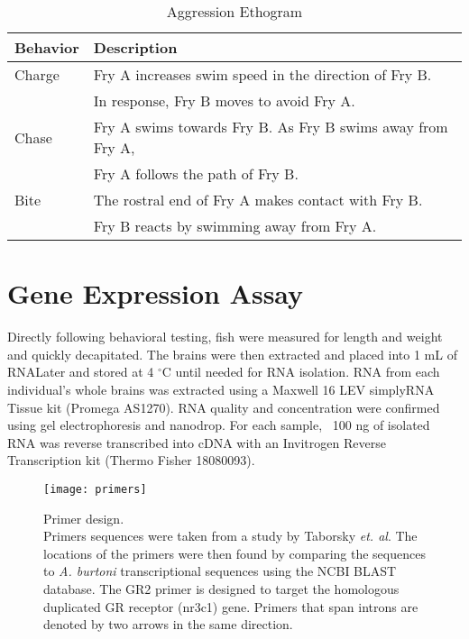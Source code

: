 \documentclass[12pt,twoside]{reedthesis}
\begin{document}
\begin{table}[htbp]
\caption[Aggression Ethogram]{Aggression Ethogram}
\begin{center}
\footnotesize
\begin{tabular}{ | l | l |}
\hline
\textbf{Behavior} & \textbf{Description}\\
\hline
  Charge & Fry A increases swim speed in the direction of Fry B. \\
  & In response, Fry B moves to avoid Fry A. \\
\hline
  Chase & Fry A swims towards Fry B. As Fry B swims away from Fry A,\\
  & Fry A follows the path of Fry B.\\
\hline
  Bite & The rostral end of Fry A makes contact with Fry B.\\
  & Fry B reacts by swimming away from Fry A. \\
\hline
\end{tabular}
\end{center}
\end{table}

\section{Gene Expression Assay}
Directly following behavioral testing, fish were measured for length and weight
and quickly decapitated. The brains were then extracted and placed into 1 mL of
RNALater and
stored at 4 $^\circ$C until needed for RNA isolation. RNA from each individual's
whole brains was extracted
using a Maxwell 16 LEV simplyRNA Tissue kit (Promega AS1270). RNA quality and concentration were confirmed using gel
electrophoresis and nanodrop. For each sample, ~100 ng of isolated RNA was
reverse transcribed into cDNA with an Invitrogen Reverse Transcription kit
(Thermo Fisher 18080093).

\begin{figure}[htbp] 
\begin{centering} 
\texttt{[image: primers]}
\caption[Primer design]{\footnotesize{Primer design. \\ Primers sequences were taken
  from a study by Taborsky \textit{et. al}. The locations of the primers were then found by
  comparing the sequences to \textit{A. burtoni} transcriptional sequences using
the NCBI BLAST database. The GR2 primer is designed to target the homologous
duplicated GR receptor (nr3c1) gene. Primers that span introns are denoted by two arrows in
the same direction.}} 
\label{subd}
\end{centering} 
\end{figure}
\end{document}
